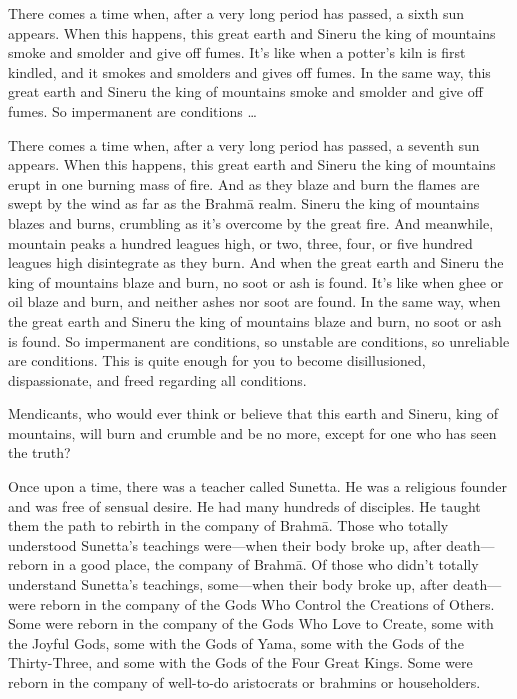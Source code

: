 \documentclass[12pt,openany]{book}%
\begin{document}
There comes a time when, after a very long period has passed, a sixth sun appears. When this happens, this great earth and Sineru the king of mountains smoke and smolder and give off fumes. It’s like when a potter’s kiln is first kindled, and it smokes and smolders and gives off fumes. In the same way, this great earth and Sineru the king of mountains smoke and smolder and give off fumes. So impermanent are conditions … 

There comes a time when, after a very long period has passed, a seventh sun appears. When this happens, this great earth and Sineru the king of mountains erupt in one burning mass of fire. And as they blaze and burn the flames are swept by the wind as far as the \textsanskrit{Brahmā} realm. Sineru the king of mountains blazes and burns, crumbling as it’s overcome by the great fire. And meanwhile, mountain peaks a hundred leagues high, or two, three, four, or five hundred leagues high disintegrate as they burn. And when the great earth and Sineru the king of mountains blaze and burn, no soot or ash is found. It’s like when ghee or oil blaze and burn, and neither ashes nor soot are found. In the same way, when the great earth and Sineru the king of mountains blaze and burn, no soot or ash is found. So impermanent are conditions, so unstable are conditions, so unreliable are conditions. This is quite enough for you to become disillusioned, dispassionate, and freed regarding all conditions. 

Mendicants, who would ever think or believe that this earth and Sineru, king of mountains, will burn and crumble and be no more, except for one who has seen the truth? 

Once upon a time, there was a teacher called Sunetta. He was a religious founder and was free of sensual desire. He had many hundreds of disciples. He taught them the path to rebirth in the company of \textsanskrit{Brahmā}. Those who totally understood Sunetta’s teachings were—when their body broke up, after death—reborn in a good place, the company of \textsanskrit{Brahmā}. Of those who didn’t totally understand Sunetta’s teachings, some—when their body broke up, after death—were reborn in the company of the Gods Who Control the Creations of Others. Some were reborn in the company of the Gods Who Love to Create, some with the Joyful Gods, some with the Gods of Yama, some with the Gods of the Thirty-Three, and some with the Gods of the Four Great Kings. Some were reborn in the company of well-to-do aristocrats or brahmins or householders. 
\end{document}
